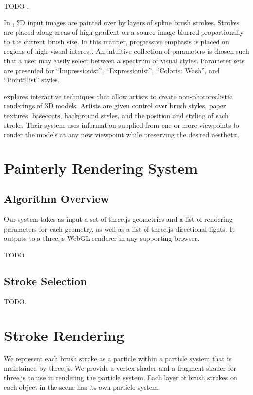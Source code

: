 \documentclass[conference]{acmsiggraph}
\begin{document}
TODO \cite{Meier:1996:PRA:237170.237288}.

In \cite{Hertzmann:1998:PRC:280814.280951}, 2D input images are painted over
by layers of spline brush strokes. Strokes are placed along areas of high
gradient on a source image blurred proportionally to the current brush size. In
this manner, progressive emphasis is  placed on regions of high visual
interest. An intuitive collection of parameters is chosen such that a user may
easily select between a spectrum of visual styles. Parameter sets are presented
for “Impressionist”, “Expressionist”, “Colorist Wash”, and “Pointillist”
styles.

\cite{Kalnins:2002:WND:566570.566648} explores interactive techniques that
allow artists to create non-photorealistic renderings of 3D models. Artists are
given control over brush styles, paper textures, basecoats, background styles,
and the position and styling of each stroke. Their system uses information
supplied from one or more viewpoints to render the models at any new viewpoint
while preserving the desired aesthetic.

\section{Painterly Rendering System}

\subsection{Algorithm Overview}

Our system takes as input a set of three.js geometries and a list of rendering
parameters for each geometry, as well as a list of three.js directional lights.
It outputs to a three.js WebGL renderer in any supporting browser.

TODO.

\subsection{Stroke Selection}

TODO.

\section{Stroke Rendering}

We represent each brush stroke as a particle within a particle system that is
maintained by three.js. We provide a vertex shader and a fragment shader for
three.js to use in rendering the particle system. Each layer of brush strokes
on each object in the scene has its own particle system.
\end{document}
